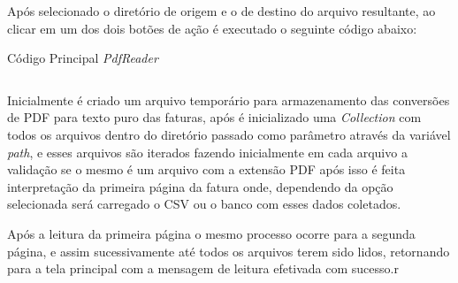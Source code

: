 Após selecionado o diretório de origem e o de destino do arquivo resultante, ao clicar em um dos dois botões de ação é executado o seguinte código abaixo:

\begin{listing}[ht]

\label{listing:pdfReader}
\caption{Código Principal \textit{PdfReader}}
\inputminted[frame=lines,
    firstline=26,
    lastline=52,
    framesep=5mm, fontsize=\footnotesize, linenos=true, label={App.java}]{java}{codigos/PdfReader/App.java}
\end{listing}

Inicialmente é criado um arquivo temporário para armazenamento das conversões de PDF para texto puro das faturas, após é inicializado uma \textit{Collection} com todos os arquivos dentro do diretório passado como parâmetro através da variável \textit{path}, e esses arquivos são iterados fazendo inicialmente em cada arquivo a validação se o mesmo é um arquivo com a extensão PDF após isso é feita interpretação da primeira página da fatura onde, dependendo da opção selecionada será carregado o CSV ou o banco com esses dados coletados.

Após a leitura da primeira página o mesmo processo ocorre para a segunda página, e assim sucessivamente até todos os arquivos terem sido lidos, retornando para a tela principal com a mensagem de leitura efetivada com sucesso.r